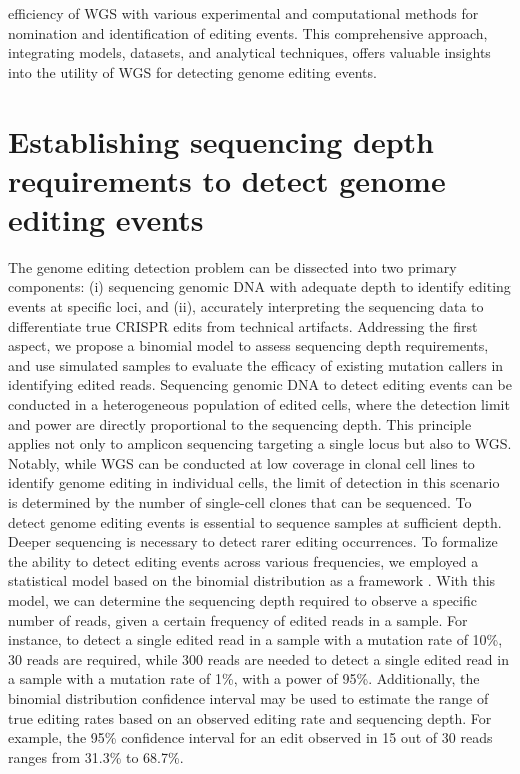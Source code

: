 \documentclass[a4paper, titlepage, openright]{book}
\begin{document}
efficiency of WGS with various experimental and computational methods for nomination and identification of editing events. This comprehensive approach, integrating models, datasets, and analytical techniques, offers valuable insights into the utility of WGS for detecting genome editing events.

\section{Establishing sequencing depth requirements to detect genome editing events}\label{section:wgs-sequencing-depth}
The genome editing detection problem can be dissected into two primary components: (i) sequencing genomic DNA with adequate depth to identify editing events at specific loci, and (ii), accurately interpreting the sequencing data to differentiate true CRISPR edits from technical artifacts. Addressing the first aspect, we propose a binomial model to assess sequencing depth requirements, and use simulated samples to evaluate the efficacy of existing mutation callers in identifying edited reads. Sequencing genomic DNA to detect editing events can be conducted in a heterogeneous population of edited cells, where the detection limit and power are directly proportional to the sequencing depth. This principle applies not only to amplicon sequencing targeting a single locus but also to WGS. Notably, while WGS can be conducted at low coverage in clonal cell lines to identify genome editing in individual cells, the limit of detection in this scenario is determined by the number of single-cell clones that can be sequenced. To detect genome editing events is essential to sequence samples at sufficient depth. Deeper sequencing is necessary to detect rarer editing occurrences. To formalize the ability to detect editing events across various frequencies, we employed a statistical model based on the binomial distribution as a framework \citep{petrackova2019standardization}. With this model, we can determine the sequencing depth required to observe a specific number of reads, given a certain frequency of edited reads in a sample. For instance, to detect a single edited read in a sample with a mutation rate of 10\%, 30 reads are required, while 300 reads are needed to detect a single edited read in a sample with a mutation rate of 1\%, with a power of 95\%. Additionally, the binomial distribution confidence interval may be used to estimate the range of true editing rates based on an observed editing rate and sequencing depth. For example, the 95\% confidence interval for an edit observed in 15 out of 30 reads ranges from 31.3\% to 68.7\%.
\end{document}
